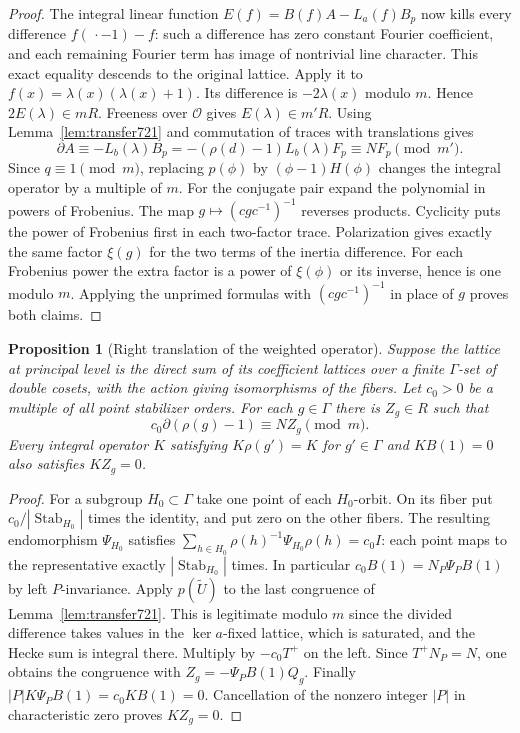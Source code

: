 \documentclass[a4paper,11pt]{article}
\newtheorem{proposition}{Proposition}[section]
\theoremstyle{definition}
\theoremstyle{remark}
\numberwithin{equation}{section}
\begin{document}
\begin{proof}
The integral linear function \(E(f)=B(f)A-L_a(f)B_p\)
now kills every difference \(f(\,\cdot-1)-f\): such a
difference has zero constant Fourier coefficient, and each
remaining Fourier term has image of nontrivial line character.
This exact equality descends to the original lattice. Apply
it to \(f(x)=\lambda(x)(\lambda(x)+1)\). Its difference is
\(-2\lambda(x)\) modulo \(m\). Hence \(2E(\lambda)\in mR\).
Freeness over \(\mathcal O\) gives \(E(\lambda)\in m'R\).
Using Lemma~\ref{lem:transfer721} and commutation of traces
with translations gives
\[
 \partial A\equiv-L_b(\lambda)B_p
      =-(\rho(d)-1)L_b(\lambda)F_p\equiv NF_p\pmod {m'} .
\]
Since \(q\equiv1\pmod m\), replacing \(p(\phi)\) by
\((\phi-1)H(\phi)\) changes the integral operator by a multiple
of \(m\). For the conjugate pair expand the polynomial in
powers of Frobenius. The map \(g\mapsto(cgc^{-1})^{-1}\)
reverses products. Cyclicity puts the power of Frobenius first
in each two-factor trace. Polarization gives exactly the same
factor \(\xi(g)\) for the two terms of the inertia difference.
For each Frobenius power the extra factor is a power of
\(\xi(\phi)\) or its inverse, hence is one modulo \(m\).
Applying the unprimed formulas with \((cgc^{-1})^{-1}\)
in place of \(g\) proves both claims.
\end{proof}

\begin{proposition}[Right translation of the weighted operator]
\leavevmode\label{prop:righttransfer721}
Suppose the lattice at principal level is the direct sum of its
coefficient lattices over a finite \(\Gamma\)-set of double
cosets, with the action giving isomorphisms of the fibers.
Let \(c_0>0\) be a multiple of all point stabilizer orders.
For each \(g\in\Gamma\) there is \(Z_g\in R\) such that
\[
        c_0\partial(\rho(g)-1)\equiv NZ_g\pmod m .
\]
Every integral operator \(K\) satisfying \(K\rho(g')=K\)
for \(g'\in\Gamma\) and \(K B(1)=0\) also satisfies \(KZ_g=0\).
\end{proposition}
\begin{proof}
For a subgroup \(H_0\subset\Gamma\) take one point of each
\(H_0\)-orbit. On its fiber put \(c_0/|\operatorname{Stab}_{H_0}|\)
times the identity, and put zero on the other fibers.
The resulting endomorphism \(\Psi_{H_0}\) satisfies
\(\sum_{h\in H_0}\rho(h)^{-1}\Psi_{H_0}\rho(h)=c_0 I\):
each point maps to the representative exactly
\(|\operatorname{Stab}_{H_0}|\) times.
In particular \(c_0 B(1)=N_P\Psi_P B(1)\) by left
\(P\)-invariance. Apply \(p(\widetilde U)\) to the last
congruence of Lemma~\ref{lem:transfer721}. This is legitimate
modulo \(m\) since the divided difference takes values in the
\(\ker a\)-fixed lattice, which is saturated, and the Hecke
sum is integral there. Multiply by \(-c_0 T^+\) on the left.
Since \(T^+N_P=N\), one obtains the congruence with
\(Z_g=-\Psi_P B(1)Q_g\). Finally
\(|P|K\Psi_P B(1)=c_0 K B(1)=0\). Cancellation of the
nonzero integer \(|P|\) in characteristic zero proves \(KZ_g=0\).
\end{proof}
\end{document}
